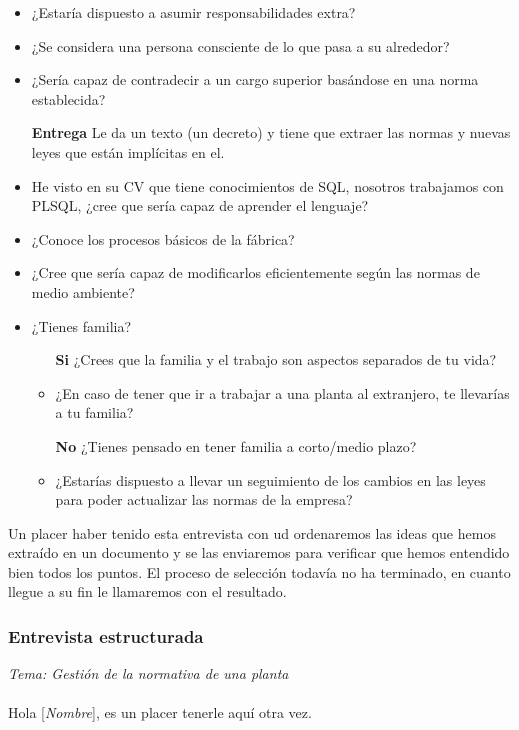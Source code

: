 \documentclass[twoside]{article}
\begin{document}
\begin{itemize}
	\item ¿Estaría dispuesto a asumir responsabilidades extra?
	\item ¿Se considera una persona consciente de lo que pasa a su alrededor?
	\item ¿Sería capaz de contradecir a un cargo superior basándose en una norma establecida?
	\item[\textbf{Entrega}] Le da un texto (un decreto) y tiene que extraer las normas y nuevas leyes que están implícitas en el.
	\item He visto en su CV que tiene conocimientos de SQL, nosotros trabajamos con PLSQL, ¿cree que sería capaz de aprender el lenguaje?
	\item ¿Conoce los procesos básicos de la fábrica?
	\item ¿Cree que sería capaz de modificarlos eficientemente según las normas de medio ambiente?
	\item ¿Tienes familia?
	\begin{itemize}		
		\item[\textbf{Si}] ¿Crees que la familia y el trabajo son aspectos separados de tu vida?
		\item ¿En caso de tener que ir a trabajar a una planta al extranjero, te llevarías a tu familia?
		\item[\textbf{No}] ¿Tienes pensado en tener familia a corto/medio plazo?
		\item ¿Estarías dispuesto a llevar un seguimiento de los cambios en las leyes para poder actualizar las normas de la empresa?
	\end{itemize}
\end{itemize}
Un placer haber tenido esta entrevista con ud ordenaremos las ideas que hemos extraído en un documento y se las enviaremos para verificar que hemos entendido bien todos los puntos. El proceso de selección todavía no ha terminado, en cuanto llegue a su fin le llamaremos con el resultado.

\subsubsection{Entrevista estructurada}
\textit{Tema: Gestión de la normativa de una planta}\\\\
Hola [\textit{Nombre}], es un placer tenerle aquí otra vez.
\end{document}
